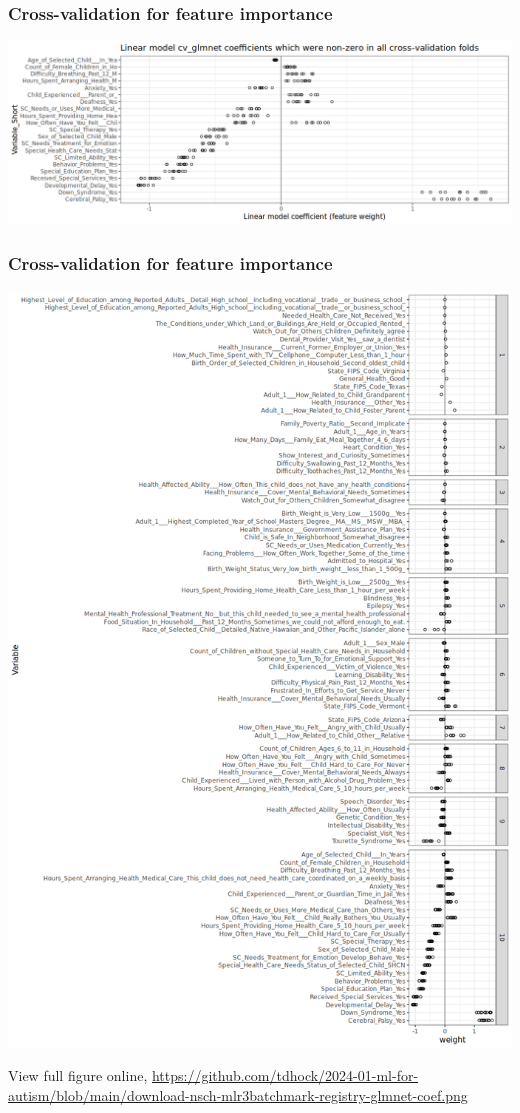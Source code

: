 \documentclass{beamer}
\begin{document}
\begin{frame}
  \frametitle{Cross-validation for feature importance}
  \includegraphics[width=\textwidth]{download-nsch-mlr3batchmark-registry-glmnet-coef-all.png}
\end{frame}

\begin{frame}
  \frametitle{Cross-validation for feature importance}
  \includegraphics[height=0.7\textheight]{download-nsch-mlr3batchmark-registry-glmnet-coef.png}

  View full figure online, \url{https://github.com/tdhock/2024-01-ml-for-autism/blob/main/download-nsch-mlr3batchmark-registry-glmnet-coef.png}
\end{frame}
\end{document}
